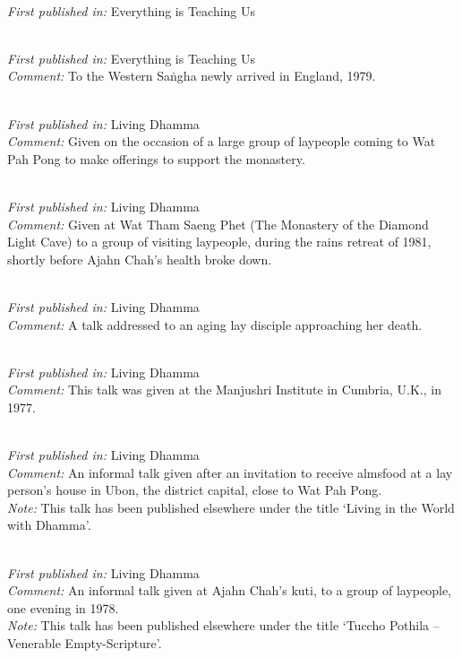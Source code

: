  \\
\textit{First published in:} Everything is Teaching Us

 \\
\textit{First published in:} Everything is Teaching Us \\
\textit{Comment:} To the Western Sa\.ngha newly arrived in England, 1979.

 \\
\textit{First published in:} Living Dhamma \\
\textit{Comment:} Given on the occasion of a large group of laypeople coming to Wat Pah Pong to make offerings to support the monastery.

 \\
\textit{First published in:} Living Dhamma \\
\textit{Comment:} Given at Wat Tham Saeng Phet (The Monastery of the Diamond Light Cave) to a group of visiting laypeople, during the rains retreat of 1981, shortly before Ajahn Chah's health broke down.

 \\
\textit{First published in:} Living Dhamma \\
\textit{Comment:} A talk addressed to an aging lay disciple approaching her death.

 \\
\textit{First published in:} Living Dhamma \\
\textit{Comment:} This talk was given at the Manjushri Institute in Cumbria, U.K., in 1977.

\clearpage

 \\
\textit{First published in:} Living Dhamma \\
\textit{Comment:} An informal talk given after an invitation to receive almsfood at a lay person's house in Ubon, the district capital, close to Wat Pah Pong. \\
\textit{Note:} This talk has been published elsewhere under the title `Living in the World with Dhamma'.

 \\
\textit{First published in:} Living Dhamma \\
\textit{Comment:} An informal talk given at Ajahn Chah's kuti, to a group of laypeople, one evening in 1978. \\
\textit{Note:} This talk has been published elsewhere under the title `Tuccho Pothila -- Venerable Empty-Scripture'.

